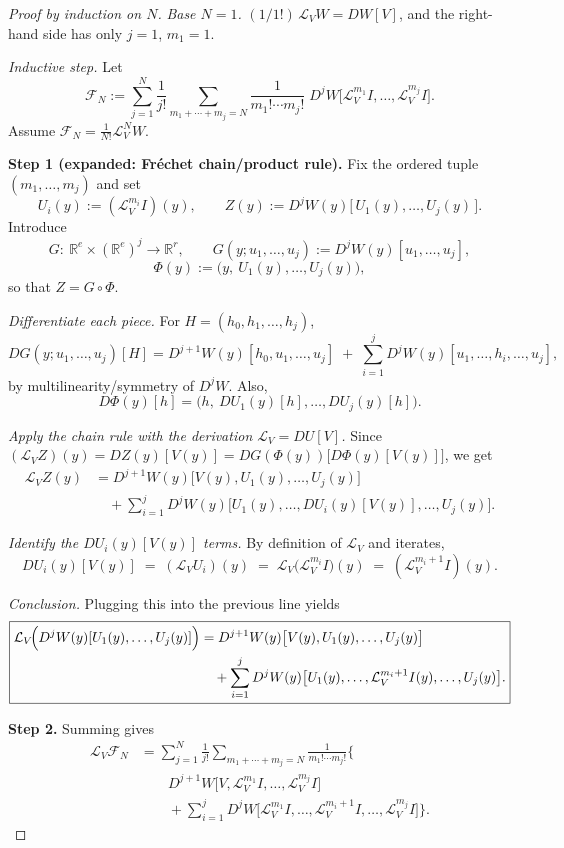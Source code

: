 \documentclass[12pt]{article}
\theoremstyle{remark}
\begin{document}
\begin{proof}[Proof by induction on $N$]
\emph{Base $N=1$.} $(1/1!)\,\mathcal{L}_V W=DW[V]$, and the right-hand side has only $j=1$, $m_1=1$.

\smallskip
\emph{Inductive step.} Let
\[
\mathcal{F}_N
:=\sum_{j=1}^{N}\frac{1}{j!}\!\!\sum_{m_1+\cdots+m_j=N}
\frac{1}{m_1!\cdots m_j!}\;
D^{j}W\big[\mathcal{L}_V^{m_1}I,\ldots,\mathcal{L}_V^{m_j}I\big].
\]
Assume $\mathcal{F}_N=\frac{1}{N!}\mathcal{L}_V^{N}W$.

\noindent
\noindent\textbf{Step 1 (expanded: Fr\'echet chain/product rule).}
Fix the ordered tuple $(m_1,\dots,m_j)$ and set
\[
U_i(y):=(\mathcal{L}_V^{m_i}I)(y),\qquad
Z(y):=D^{j}W(y)\big[\,U_1(y),\dots,U_j(y)\,\big].
\]
Introduce
\[
G:\ \mathbb{R}^e\times(\mathbb{R}^e)^j\to\mathbb{R}^r,
\qquad
G(y;u_1,\dots,u_j):=D^{j}W(y)[u_1,\dots,u_j],
\]
\[
\Phi(y):=\big(y,\ U_1(y),\dots,U_j(y)\big),
\]
so that \(Z=G\circ \Phi\).

\smallskip
\emph{Differentiate each piece.}
For $H=(h_0,h_1,\dots,h_j)$,
\[
DG(y;u_1,\dots,u_j)[H]
=
D^{j+1}W(y)[h_0,u_1,\dots,u_j]
\;+\;\sum_{i=1}^j D^{j}W(y)[u_1,\dots,h_i,\dots,u_j],
\]
by multilinearity/symmetry of $D^jW$.
Also,
\[
D\Phi(y)[h]=\big(h,\ DU_1(y)[h],\dots,DU_j(y)[h]\big).
\]

\smallskip
\emph{Apply the chain rule with the derivation $\mathcal{L}_V=DU[V]$.}
Since $(\mathcal{L}_VZ)(y)=DZ(y)[V(y)]=DG(\Phi(y))\big[D\Phi(y)[V(y)]\big]$, we get
\[
\begin{aligned}
\mathcal{L}_VZ(y)
&= D^{j+1}W(y)\big[V(y),U_1(y),\dots,U_j(y)\big]\\
&\quad+\sum_{i=1}^j D^{j}W(y)\big[U_1(y),\dots,DU_i(y)[V(y)],\dots,U_j(y)\big].
\end{aligned}
\]

\smallskip
\emph{Identify the $DU_i(y)[V(y)]$ terms.}
By definition of $\mathcal{L}_V$ and iterates,
\[
DU_i(y)[V(y)] \;=\; (\mathcal{L}_V U_i)(y)
\;=\; \mathcal{L}_V\big(\mathcal{L}_V^{m_i}I\big)(y)
\;=\; (\mathcal{L}_V^{m_i+1}I)(y).
\]

\smallskip
\emph{Conclusion.} Plugging this into the previous line yields
\[
\boxed{%
\begin{aligned}
\mathcal{L}_V\!\Big(D^{j}W(y)[U_1(y),\dots,U_j(y)]\Big)
&= D^{j+1}W(y)\big[V(y),U_1(y),\dots,U_j(y)\big]\\
&\quad + \sum_{i=1}^j D^{j}W(y)\big[U_1(y),\dots,\mathcal{L}_V^{m_i+1}I(y),\dots,U_j(y)\big].
\end{aligned}}
\]

\noindent
\textbf{Step 2.} Summing gives
\[
\begin{aligned}
\mathcal{L}_V\mathcal{F}_N
&= \sum_{j=1}^{N}\frac{1}{j!}
   \sum_{m_1+\cdots+m_j=N}\frac{1}{m_1!\cdots m_j!}
   \Big\{ \\
&\qquad D^{j+1}W\big[V,\mathcal{L}_V^{m_1}I,\ldots,\mathcal{L}_V^{m_j}I\big] \\
&\qquad + \sum_{i=1}^j
   D^{j}W\big[\mathcal{L}_V^{m_1}I,\ldots,\mathcal{L}_V^{m_i+1}I,\ldots,\mathcal{L}_V^{m_j}I\big]
   \Big\}.
\end{aligned}
\tag{$\ast$}
\]


\end{proof}
\end{document}
